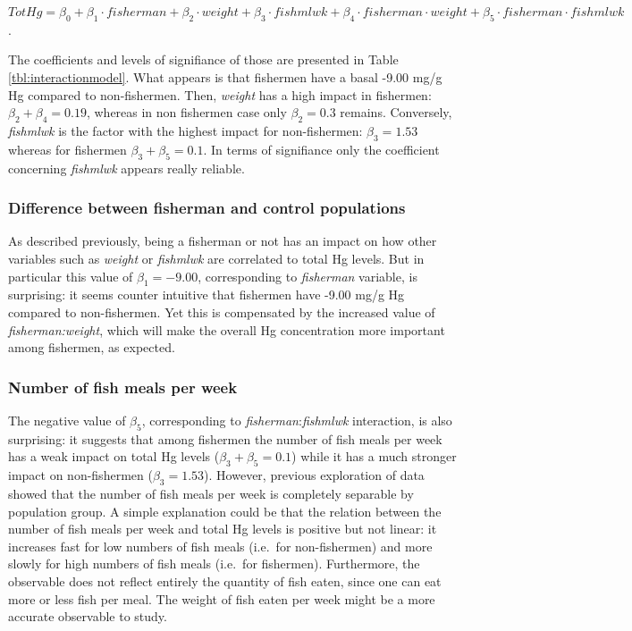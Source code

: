 \documentclass[12pt,]{article}
\begin{document}
\(TotHg = \beta_0 + \beta_1 \cdot fisherman + \beta_2 \cdot weight + \beta_3 \cdot fishmlwk + \beta_4 \cdot fisherman \cdot weight + \beta_5 \cdot fisherman \cdot fishmlwk\).

The coefficients and levels of signifiance of those are presented in
Table \ref{tbl:interactionmodel}. What appears is that fishermen have a
basal -9.00 mg/g Hg compared to non-fishermen. Then, \emph{weight} has a
high impact in fishermen: \(\beta_2+\beta_4 = 0.19\), whereas in non
fishermen case only \(\beta_2 = 0.3\) remains. Conversely,
\emph{fishmlwk} is the factor with the highest impact for non-fishermen:
\(\beta_3 = 1.53\) whereas for fishermen \(\beta_3+\beta_5 = 0.1\). In
terms of signifiance only the coefficient concerning \emph{fishmlwk}
appears really reliable.

\subsubsection{Difference between fisherman and control
populations}\label{difference-between-fisherman-and-control-populations}

As described previously, being a fisherman or not has an impact on how
other variables such as \emph{weight} or \emph{fishmlwk} are correlated
to total Hg levels. But in particular this value of \(\beta_1 = -9.00\),
corresponding to \emph{fisherman} variable, is surprising: it seems
counter intuitive that fishermen have -9.00 mg/g Hg compared to
non-fishermen. Yet this is compensated by the increased value of
\emph{fisherman:weight}, which will make the overall Hg concentration
more important among fishermen, as expected.

\subsubsection{Number of fish meals per
week}\label{number-of-fish-meals-per-week}

The negative value of \(\beta_5\), corresponding to
\emph{fisherman}:\emph{fishmlwk} interaction, is also surprising: it
suggests that among fishermen the number of fish meals per week has a
weak impact on total Hg levels (\(\beta_3+\beta_5 = 0.1\)) while it has
a much stronger impact on non-fishermen (\(\beta_3 = 1.53\)). However,
previous exploration of data showed that the number of fish meals per
week is completely separable by population group. A simple explanation
could be that the relation between the number of fish meals per week and
total Hg levels is positive but not linear: it increases fast for low
numbers of fish meals (i.e.~for non-fishermen) and more slowly for high
numbers of fish meals (i.e.~for fishermen). Furthermore, the observable
does not reflect entirely the quantity of fish eaten, since one can eat
more or less fish per meal. The weight of fish eaten per week might be a
more accurate observable to study.
\end{document}
